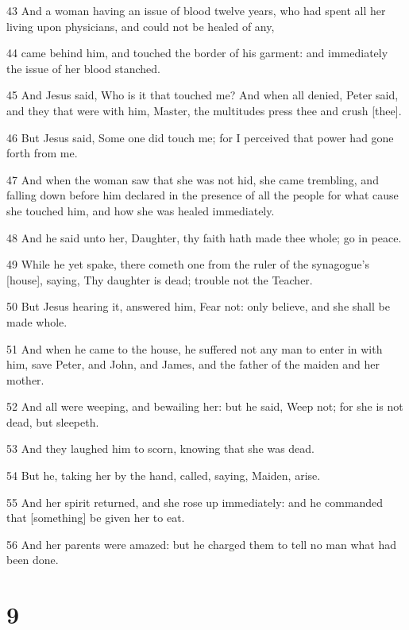 \par 43 And a woman having an issue of blood twelve years, who had spent all her living upon physicians, and could not be healed of any,
\par 44 came behind him, and touched the border of his garment: and immediately the issue of her blood stanched.
\par 45 And Jesus said, Who is it that touched me? And when all denied, Peter said, and they that were with him, Master, the multitudes press thee and crush [thee].
\par 46 But Jesus said, Some one did touch me; for I perceived that power had gone forth from me.
\par 47 And when the woman saw that she was not hid, she came trembling, and falling down before him declared in the presence of all the people for what cause she touched him, and how she was healed immediately.
\par 48 And he said unto her, Daughter, thy faith hath made thee whole; go in peace.
\par 49 While he yet spake, there cometh one from the ruler of the synagogue's [house], saying, Thy daughter is dead; trouble not the Teacher.
\par 50 But Jesus hearing it, answered him, Fear not: only believe, and she shall be made whole.
\par 51 And when he came to the house, he suffered not any man to enter in with him, save Peter, and John, and James, and the father of the maiden and her mother.
\par 52 And all were weeping, and bewailing her: but he said, Weep not; for she is not dead, but sleepeth.
\par 53 And they laughed him to scorn, knowing that she was dead.
\par 54 But he, taking her by the hand, called, saying, Maiden, arise.
\par 55 And her spirit returned, and she rose up immediately: and he commanded that [something] be given her to eat.
\par 56 And her parents were amazed: but he charged them to tell no man what had been done.

\chapter{9}

